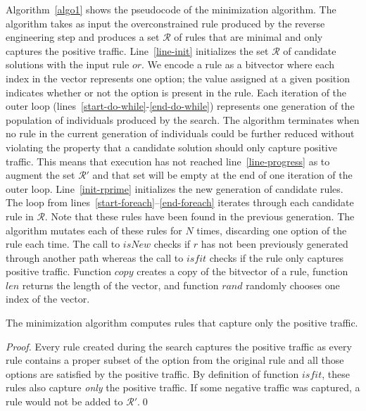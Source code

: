 \documentclass[sigconf,anonymous]{acmart}
\begin{document}
Algorithm~\ref{algo1} shows the pseudocode of the \tname{}
minimization algorithm. The algorithm takes as input the
overconstrained rule produced by the reverse engineering step and
produces a set $\mathcal R$ of rules that are minimal and only
captures the positive traffic. Line~\ref{line-init} initializes the
set $\mathcal{R}$ of candidate solutions with the input rule $or$. We
encode a rule as a bitvector where each index in the vector represents
one option; the value assigned at a given position indicates whether
or not the option is present in the rule. Each iteration of the outer
loop (lines~\ref{start-do-while}-\ref{end-do-while}) represents one
generation of the population of individuals produced by the
search. The algorithm terminates when no rule in the current
generation of individuals could be further reduced without violating
the property that a candidate solution should only capture positive
traffic. This means that execution has not reached
line~\ref{line-progress} as to augment the set $\mathcal{R'}$ and that
set will be empty at the end of one iteration of the outer
loop. Line~\ref{init-rprime} initializes the new generation of
candidate rules. The loop from
lines~\ref{start-foreach}--\ref{end-foreach} iterates through each
candidate rule in $\mathcal R$. Note that these rules have been found
in the previous generation. The algorithm mutates each of these rules
for $N$ times, discarding one option of the rule each time. The call
to $\mathit{isNew}$ checks if $r$ has not been previously generated
through another path whereas the call to $\mathit{isfit}$ checks if
the rule only captures positive traffic. Function $\mathit{copy}$
creates a copy of the bitvector of a rule, function $\mathit{len}$
returns the length of the vector, and function $\mathit{rand}$
randomly chooses one index of the vector.

\begin{theorem}
  The minimization algorithm computes rules that capture only
  the positive traffic.
\end{theorem}
\begin{proof}
  Every rule created during the search captures the positive traffic
  as every rule contains a proper subset of the option from the
  original rule and all those options are satisfied by the positive
  traffic. By definition of function $\mathit{isfit}$, these rules
  also capture \emph{only} the positive traffic. If some negative
  traffic was captured, a rule would not be added to $\mathcal
  R'$.\qed
\end{proof}
\end{document}
